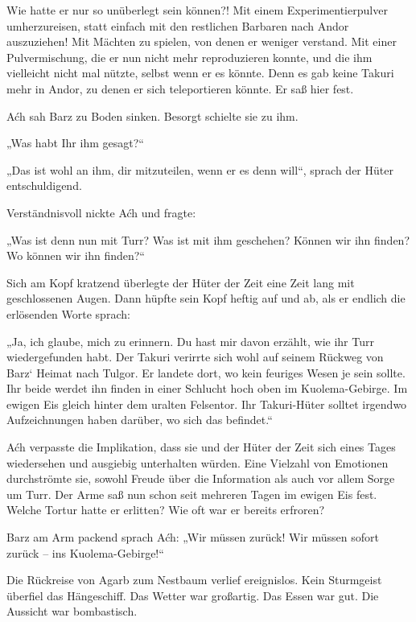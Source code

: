 Wie hatte er nur so unüberlegt sein können?! Mit einem Experimentierpulver umherzureisen, statt einfach mit den restlichen Barbaren nach Andor auszuziehen! Mit Mächten zu spielen, von denen er weniger verstand. Mit einer Pulvermischung, die er nun nicht mehr reproduzieren konnte, und die ihm vielleicht nicht mal nützte, selbst wenn er es könnte. Denn es gab keine Takuri mehr in Andor, zu denen er sich teleportieren könnte. Er saß hier fest.



\trennzeichen



Aćh sah Barz zu Boden sinken. Besorgt schielte sie zu ihm.

„Was habt Ihr ihm gesagt?“

„Das ist wohl an ihm, dir mitzuteilen, wenn er es denn will“, sprach der Hüter entschuldigend.

Verständnisvoll nickte Aćh und fragte:

„Was ist denn nun mit Turr? Was ist mit ihm geschehen? Können wir ihn finden? Wo können wir ihn finden?“

Sich am Kopf kratzend überlegte der Hüter der Zeit eine Zeit lang mit geschlossenen Augen. Dann hüpfte sein Kopf heftig auf und ab, als er endlich die erlösenden Worte sprach:

„Ja, ich glaube, mich zu erinnern. Du hast mir davon erzählt, wie ihr Turr wiedergefunden habt. Der Takuri verirrte sich wohl auf seinem Rückweg von Barz‘ Heimat nach Tulgor. Er landete dort, wo kein feuriges Wesen je sein sollte. Ihr beide werdet ihn finden in einer Schlucht hoch oben im Kuolema-Gebirge. Im ewigen Eis gleich hinter dem uralten Felsentor. Ihr Takuri-Hüter solltet irgendwo Aufzeichnungen haben darüber, wo sich das befindet.“

Aćh verpasste die Implikation, dass sie und der Hüter der Zeit sich eines Tages wiedersehen und ausgiebig unterhalten würden. Eine Vielzahl von Emotionen durchströmte sie, sowohl Freude über die Information als auch vor allem Sorge um Turr. Der Arme saß nun schon seit mehreren Tagen im ewigen Eis fest. Welche Tortur hatte er erlitten? Wie oft war er bereits erfroren?

Barz am Arm packend sprach Aćh: „Wir müssen zurück! Wir müssen sofort zurück – ins Kuolema-Gebirge!“



\trennzeichen



Die Rückreise von Agarb zum Nestbaum verlief ereignislos. Kein Sturmgeist überfiel das Hängeschiff. Das Wetter war großartig. Das Essen war gut. Die Aussicht war bombastisch.

